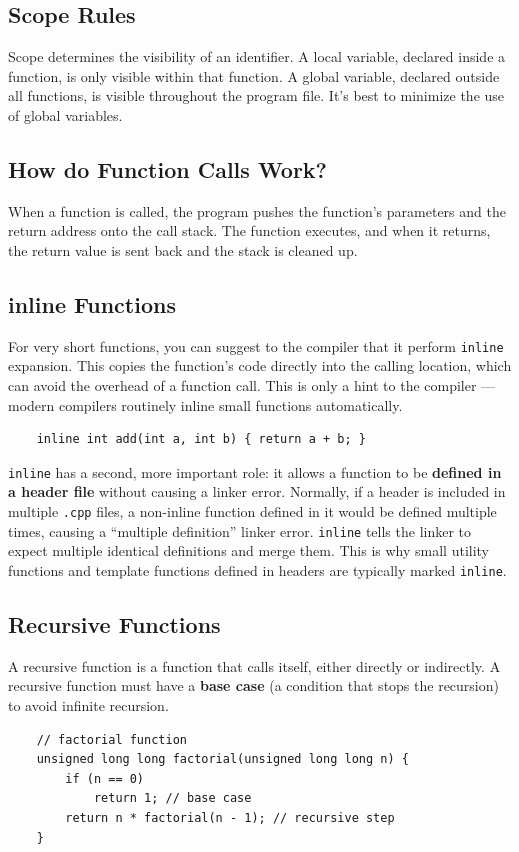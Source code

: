 \subsection{Scope Rules}
Scope determines the visibility of an identifier. A local variable, declared inside a function, is only visible within that function. A global variable, declared outside all functions, is visible throughout the program file. It's best to minimize the use of global variables.

\subsection{How do Function Calls Work?}
When a function is called, the program pushes the function's parameters and the return address onto the call stack. The function executes, and when it returns, the return value is sent back and the stack is cleaned up.

\subsection{inline Functions}
For very short functions, you can suggest to the compiler that it perform \texttt{inline} expansion. This copies the function's code directly into the calling location, which can avoid the overhead of a function call. This is only a hint to the compiler — modern compilers routinely inline small functions automatically.
\begin{lstlisting}
	inline int add(int a, int b) { return a + b; }
\end{lstlisting}

\begin{remark}
	\texttt{inline} has a second, more important role: it allows a function to be \textbf{defined in a header file} without causing a linker error. Normally, if a header is included in multiple \texttt{.cpp} files, a non-inline function defined in it would be defined multiple times, causing a ``multiple definition'' linker error. \texttt{inline} tells the linker to expect multiple identical definitions and merge them. This is why small utility functions and template functions defined in headers are typically marked \texttt{inline}.
\end{remark}

\subsection{Recursive Functions}
A recursive function is a function that calls itself, either directly or indirectly. A recursive function must have a \textbf{base case} (a condition that stops the recursion) to avoid infinite recursion.
\begin{lstlisting}
	// factorial function
	unsigned long long factorial(unsigned long long n) {
		if (n == 0)
			return 1; // base case
		return n * factorial(n - 1); // recursive step
	}
\end{lstlisting}

